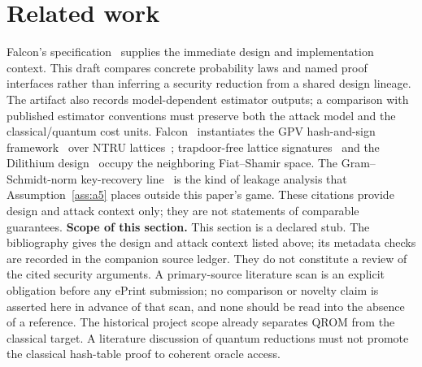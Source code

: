 \section{Related work}\label{sec:related}
Falcon's specification~\cite{falcon2020} supplies the immediate design
and implementation context. This draft compares concrete probability
laws and named proof interfaces rather than inferring a security
reduction from a shared design lineage. The artifact also records
model-dependent estimator outputs; a comparison with published
estimator conventions must preserve both the attack model and the
classical/quantum cost units.
Falcon~\cite{falcon2018,falcon2020} instantiates the GPV hash-and-sign
framework~\cite{gpv2008} over NTRU lattices~\cite{hps1998};
trapdoor-free lattice signatures~\cite{lyu2012} and the Dilithium
design~\cite{dilithium2018} occupy the neighboring Fiat--Shamir space.
The Gram--Schmidt-norm key-recovery line~\cite{fktwy2020} is the kind
of leakage analysis that Assumption~\ref{ass:a5} places outside this
paper's game. These citations provide design and attack context only;
they are not statements of comparable guarantees.
\noindent\textbf{Scope of this section.} This section is a declared
stub. The bibliography gives the design and attack context listed above;
its metadata checks are recorded in the companion source ledger. They
do not constitute a review of the cited security arguments.
A primary-source literature scan is an explicit obligation before any
ePrint submission; no comparison or novelty claim is asserted here in
advance of that scan, and none should be read into the absence of a
reference.
The historical project scope already separates QROM from the classical
target. A literature discussion of quantum reductions must not promote
the classical hash-table proof to coherent oracle access.
